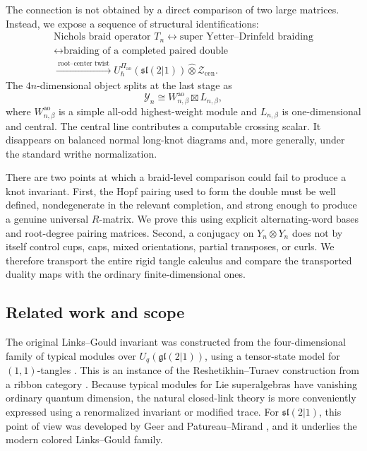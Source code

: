 \documentclass[11pt,a4paper]{article}
\newcommand{\hot}{\widehat\otimes}
\newcommand{\ao}{\mathrm{ao}}
\newcommand{\cen}{\mathrm{cen}}
\theoremstyle{definition}
\theoremstyle{remark}
\begin{document}
The connection is not obtained by a direct comparison of two large
matrices.  Instead, we expose a sequence of structural identifications:
\[
\begin{gathered}
\text{Nichols braid operator }T_n
\longleftrightarrow
\text{super Yetter--Drinfeld braiding}\\
\longleftrightarrow
\text{braiding of a completed paired double}\\
\xrightarrow{\ \text{root--center twist}\ }
U_\hbar^{\Pi_{\ao}}(\mathfrak{sl}(2|1))
\hot \mathcal Z_{\cen}.
\end{gathered}
\]
The \(4n\)-dimensional object splits at the last stage as
\[
 \mathcal Y_n\cong W_{n,\beta}^{\ao}\boxtimes L_{n,\beta},
\]
where \(W_{n,\beta}^{\ao}\) is a simple all-odd highest-weight module and
\(L_{n,\beta}\) is one-dimensional and central.  The central line
contributes a computable crossing scalar.  It disappears on balanced
normal long-knot diagrams and, more generally, under the standard writhe
normalization.

There are two points at which a braid-level comparison could fail to
produce a knot invariant.  First, the Hopf pairing used to form the double
must be well defined, nondegenerate in the relevant completion, and strong
enough to produce a genuine universal \(R\)-matrix.  We prove this using
explicit alternating-word bases and root-degree pairing matrices.  Second, a
conjugacy on \(Y_n\otimes Y_n\) does not by itself control cups, caps,
mixed orientations, partial transposes, or curls.  We therefore transport
the entire rigid tangle calculus and compare the transported duality maps
with the ordinary finite-dimensional ones.

\subsection{Related work and scope}

The original Links--Gould invariant was constructed from the
four-dimensional family of typical modules over
\(U_q(\mathfrak{gl}(2|1))\), using a tensor-state model for
\((1,1)\)-tangles \cite{DeWitKauffmanLinks}.  This is an instance of the
Reshetikhin--Turaev construction from a ribbon category
\cite{ReshetikhinTuraev}.  Because typical modules for Lie superalgebras
have vanishing ordinary quantum dimension, the natural closed-link theory
is more conveniently expressed using a renormalized invariant or modified
trace.  For \(\mathfrak{sl}(2|1)\), this point of view was developed by
Geer and Patureau--Mirand \cite{GeerPatureau}, and it underlies the modern
colored Links--Gould family.
\end{document}
